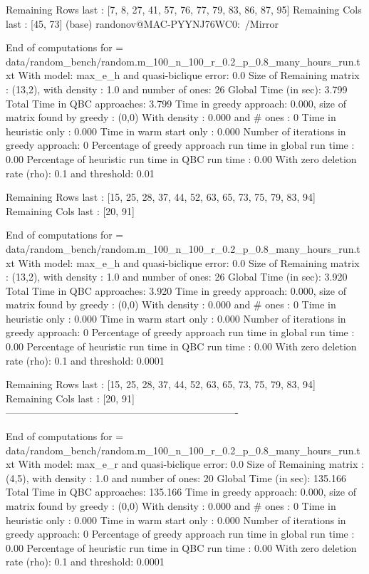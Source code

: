  Remaining Rows last : [7, 8, 27, 41, 57, 76, 77, 79, 83, 86, 87, 95]
 Remaining  Cols  last : [45, 73]
(base) randonov@MAC-PYYNJ76WC0:~/Mirror
 
    End of computations for = data/random_bench/random.m_100_n_100_r_0.2_p_0.8_many_hours_run.txt 
    With  model: max_e_h and quasi-biclique error: 0.0
    Size of Remaining matrix : (13,2), with  density : 1.0 and number of ones: 26
    Global Time (in sec): 3.799
    Total Time in QBC approaches: 3.799
    Time in greedy approach: 0.000,  size of matrix found by greedy : (0,0) 
    With density : 0.000 and # ones : 0 
    Time in heuristic only : 0.000 
    Time in warm start only : 0.000
    Number of iterations in greedy approach: 0
    Percentage of greedy approach run time in global run time : 0.00%
    Percentage of heuristic run time in QBC run time : 0.00%
    With zero deletion rate (rho): 0.1 and threshold: 0.01
    
 Remaining Rows last : [15, 25, 28, 37, 44, 52, 63, 65, 73, 75, 79, 83, 94]
 Remaining  Cols  last : [20, 91]
  
    End of computations for = data/random_bench/random.m_100_n_100_r_0.2_p_0.8_many_hours_run.txt 
    With  model: max_e_h and quasi-biclique error: 0.0
    Size of Remaining matrix : (13,2), with  density : 1.0 and number of ones: 26
    Global Time (in sec): 3.920
    Total Time in QBC approaches: 3.920
    Time in greedy approach: 0.000,  size of matrix found by greedy : (0,0) 
    With density : 0.000 and # ones : 0 
    Time in heuristic only : 0.000 
    Time in warm start only : 0.000
    Number of iterations in greedy approach: 0
    Percentage of greedy approach run time in global run time : 0.00%
    Percentage of heuristic run time in QBC run time : 0.00%
    With zero deletion rate (rho): 0.1 and threshold: 0.0001
    
 Remaining Rows last : [15, 25, 28, 37, 44, 52, 63, 65, 73, 75, 79, 83, 94]
 Remaining  Cols  last : [20, 91]
 ----------------------------------------------------------------------
 
    End of computations for = data/random_bench/random.m_100_n_100_r_0.2_p_0.8_many_hours_run.txt 
    With  model: max_e_r and quasi-biclique error: 0.0
    Size of Remaining matrix : (4,5), with  density : 1.0 and number of ones: 20
    Global Time (in sec): 135.166
    Total Time in QBC approaches: 135.166
    Time in greedy approach: 0.000,  size of matrix found by greedy : (0,0) 
    With density : 0.000 and # ones : 0 
    Time in heuristic only : 0.000 
    Time in warm start only : 0.000
    Number of iterations in greedy approach: 0
    Percentage of greedy approach run time in global run time : 0.00%
    Percentage of heuristic run time in QBC run time : 0.00%
    With zero deletion rate (rho): 0.1 and threshold: 0.0001
    
